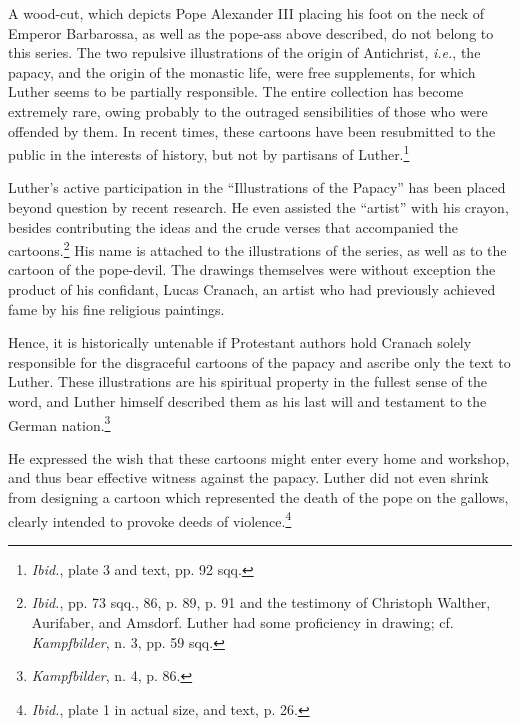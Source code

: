 A wood-cut, which depicts Pope Alexander III placing his foot on
the neck of Emperor Barbarossa, as well as the pope-ass above described,
do not belong to this series. The two repulsive illustrations of
the origin of Antichrist, \textit{i.e.}, the papacy, and the origin of the monastic
life, were free supplements, for which Luther seems to be partially responsible.
The entire collection has become extremely rare,
owing probably to the outraged sensibilities of those who were offended
by them. In recent times, these cartoons have been resubmitted to the
public in the interests of history, but not by partisans of Luther.\footnote{\textit{Ibid.}, plate 3 and text, pp. 92 sqq.}

Luther’s active participation in the “Illustrations of the Papacy”
has been placed beyond question by recent research. He even assisted
the “artist” with his crayon, besides contributing the ideas
and the crude verses that accompanied the cartoons.\footnote
{\textit{Ibid.}, pp. 73 sqq., 86, p. 89, p. 91 and the testimony of Christoph Walther, Aurifaber,
and Amsdorf. Luther had some proficiency in drawing; cf. \textit{Kampfbilder}, n. 3, pp. 59 sqq.}
His name is
attached to the illustrations of the series, as well as to the cartoon of
the pope-devil. The drawings themselves were without exception the
product of his confidant, Lucas Cranach, an artist who had previously
achieved fame by his fine religious paintings.

Hence, it is historically untenable if Protestant authors hold Cranach
solely responsible for the disgraceful cartoons of the papacy and
ascribe only the text to Luther. These illustrations are his spiritual
property in the fullest sense of the word, and Luther himself described
them as his last will and testament to the German nation.\footnote{\textit{Kampfbilder}, n. 4, p. 86.}

He expressed the wish that these cartoons might enter every home
and workshop, and thus bear effective witness against the papacy.
Luther did not even shrink from designing a cartoon which represented
the death of the pope on the gallows, clearly intended to provoke deeds
of violence.\footnote{\textit{Ibid.}, plate 1 in actual size, and text, p. 26.}

